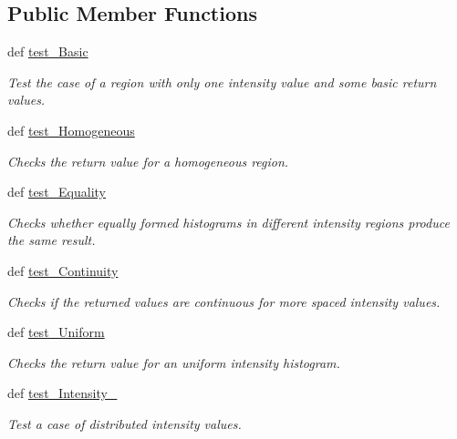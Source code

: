 \subsection*{Public Member Functions}
\begin{DoxyCompactItemize}
\item 
def \hyperlink{classmedpy_1_1unittests_1_1filter_1_1LabelImageStatistics_1_1TestLabelImageStatisticsClass_a11774eb7b34a0b57706f900ada133e6c}{test\_\-Basic}
\begin{DoxyCompactList}\small\item\em Test the case of a region with only one intensity value and some basic return values. \end{DoxyCompactList}\item 
def \hyperlink{classmedpy_1_1unittests_1_1filter_1_1LabelImageStatistics_1_1TestLabelImageStatisticsClass_a1d0ee16f881a31e630361188b95e0b67}{test\_\-Homogeneous}
\begin{DoxyCompactList}\small\item\em Checks the return value for a homogeneous region. \end{DoxyCompactList}\item 
def \hyperlink{classmedpy_1_1unittests_1_1filter_1_1LabelImageStatistics_1_1TestLabelImageStatisticsClass_aec02bcfd0d2094a05786a87d0f6c2f65}{test\_\-Equality}
\begin{DoxyCompactList}\small\item\em Checks whether equally formed histograms in different intensity regions produce the same result. \end{DoxyCompactList}\item 
def \hyperlink{classmedpy_1_1unittests_1_1filter_1_1LabelImageStatistics_1_1TestLabelImageStatisticsClass_aa2077eec84a00d739c7f37ade7cf8780}{test\_\-Continuity}
\begin{DoxyCompactList}\small\item\em Checks if the returned values are continuous for more spaced intensity values. \end{DoxyCompactList}\item 
def \hyperlink{classmedpy_1_1unittests_1_1filter_1_1LabelImageStatistics_1_1TestLabelImageStatisticsClass_a795ea99625a761931ae65abf4501b282}{test\_\-Uniform}
\begin{DoxyCompactList}\small\item\em Checks the return value for an uniform intensity histogram. \end{DoxyCompactList}\item 
def \hyperlink{classmedpy_1_1unittests_1_1filter_1_1LabelImageStatistics_1_1TestLabelImageStatisticsClass_a1646923c7eed240ab186bee76653f880}{test\_\-Intensity\_}
\begin{DoxyCompactList}\small\item\em Test a case of distributed intensity values. \end{DoxyCompactList}\end{DoxyCompactItemize}


